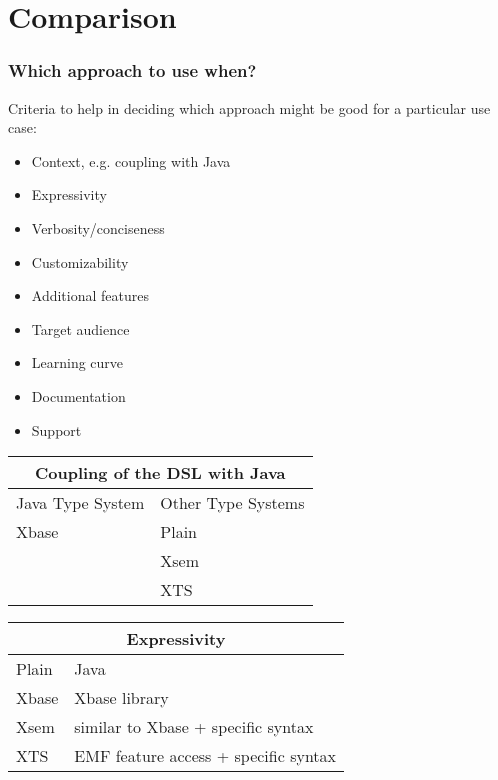 \section{Comparison}

\begin{frame}
  \frametitle{Which approach to use when?}
  
  Criteria to help in deciding which approach might be good for a particular use
  case:
  \begin{itemize}
    \item Context, e.g. coupling with Java
    \item Expressivity
    \item Verbosity/conciseness
    \item Customizability
    \item Additional features
    \item Target audience
    \item Learning curve
    \item Documentation
    \item Support
  \end{itemize}

\framebreak  
\begin{tabularx}{\linewidth}{ X   X }
\multicolumn{2}{c}{Coupling of the DSL with Java} \\ \hline
Java Type System & Other Type Systems \\ \hline
Xbase & Plain  \\
& Xsem  \\
& XTS  \\
\end{tabularx}
\begin{itemize}
\end{itemize}

\framebreak
\begin{tabularx}{\linewidth}{ l   X }
\multicolumn{2}{c}{Expressivity} \\ \hline
Plain & Java \\
Xbase & Xbase library \\
Xsem & similar to Xbase + specific syntax\\
XTS & EMF feature access + specific syntax\\
\end{tabularx}


\end{frame}
